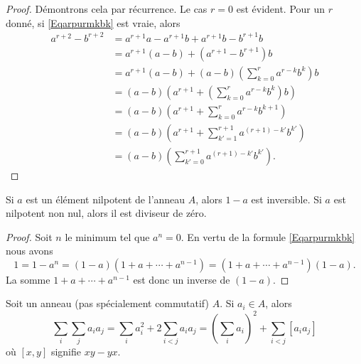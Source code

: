 \begin{proof}
	Démontrons cela par récurrence. Le cas \( r = 0 \) est évident. Pour
	un \( r \) donné, si \eqref{Eqarpurmkbk} est vraie, alors
	\begin{align*}
		a^{r+2}-b^{r+2} & = a^{r+1}a - a^{r+1}b +a^{r+1}b - b^{r+1}b                            \\
		                & = a^{r+1}(a - b) + (a^{r+1} - b^{r+1})b                               \\
		                & = a^{r+1}(a - b) + (a-b)\left(\sum_{k=0}^ra^{r-k}b^k\right)b          \\
		                & = (a - b) \left(a^{r+1} + \left(\sum_{k=0}^ra^{r-k}b^k\right)b\right) \\
		                & = (a - b) \left(a^{r+1} + \sum_{k=0}^ra^{r-k}b^{k + 1}\right)         \\
		                & = (a - b) \left(a^{r+1} + \sum_{k'=1}^{r+1}a^{(r+1)-k'}b^{k'}\right)  \\
		                & = (a - b) \left(\sum_{k'=0}^{r+1}a^{(r+1)-k'}b^{k'}\right).
	\end{align*}
\end{proof}

\begin{proposition}
	Si \( a\) est un élément nilpotent de l'anneau \( A\), alors \( 1-a\) est inversible. Si \( a\) est nilpotent non nul, alors il est diviseur de zéro.
\end{proposition}

\begin{proof}
	Soit \( n\) le minimum tel que \( a^n=0\). En vertu de la formule \eqref{Eqarpurmkbk} nous avons
	\begin{equation}
		1=1-a^n=(1-a)(1+a+\cdots+a^{n-1})=(1+a+\cdots+a^{n-1})(1-a).
	\end{equation}
	La somme \( 1+a+\cdots+a^{n-1}\) est donc un inverse de \( (1-a)\).
\end{proof}

\begin{proposition}	\label{PROPooQMZMooBrQhhr}
	Soit un anneau (pas spécialement commutatif) \( A\). Si \( a_i\in A\), alors
	\begin{equation}
		\sum_i\sum_ja_ia_j=\sum_ia_i^2+2\sum_{i<j}a_ia_j=(\sum_ia_i)^2+\sum_{i<j}[a_ia_j]
	\end{equation}
	où \( [x,y]\) signifie \( xy-yx\).
\end{proposition}


